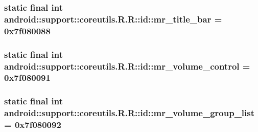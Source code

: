 \hypertarget{classandroid_1_1support_1_1coreutils_1_1_r_1_1id_504aba9e1cea1b28ec3cab80371508b1}{
\subsubsection[{mr\_\-title\_\-bar}]{\setlength{\rightskip}{0pt plus 5cm}static final int android::support::coreutils.R.R::id::mr\_\-title\_\-bar = 0x7f080088}}
\label{classandroid_1_1support_1_1coreutils_1_1_r_1_1id_504aba9e1cea1b28ec3cab80371508b1}


\hypertarget{classandroid_1_1support_1_1coreutils_1_1_r_1_1id_ad76b2574fe38c4af601407f63bcb206}{
\subsubsection[{mr\_\-volume\_\-control}]{\setlength{\rightskip}{0pt plus 5cm}static final int android::support::coreutils.R.R::id::mr\_\-volume\_\-control = 0x7f080091}}
\label{classandroid_1_1support_1_1coreutils_1_1_r_1_1id_ad76b2574fe38c4af601407f63bcb206}


\hypertarget{classandroid_1_1support_1_1coreutils_1_1_r_1_1id_fdf5490696c8285e7eddc99d78e850a2}{
\subsubsection[{mr\_\-volume\_\-group\_\-list}]{\setlength{\rightskip}{0pt plus 5cm}static final int android::support::coreutils.R.R::id::mr\_\-volume\_\-group\_\-list = 0x7f080092}}
\label{classandroid_1_1support_1_1coreutils_1_1_r_1_1id_fdf5490696c8285e7eddc99d78e850a2}


